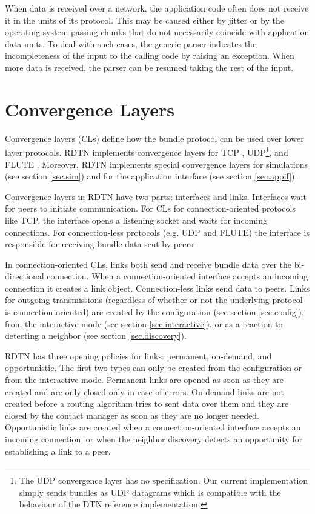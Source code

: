 \documentclass[a4paper]{article}
\begin{document}
When data is received over a network, the application code often does not
receive it in the units of its protocol. This may be caused either by jitter or
by the operating system passing chunks that do not necessarily coincide with
application data units. To deal with such cases, the generic parser indicates
the incompleteness of the input to the calling code by raising an exception.
When more data is received, the parser can be resumed taking the rest of the
input.

\section{Convergence Layers}\label{sec.cl}

Convergence layers (CLs) define how the bundle protocol can be used over lower
layer protocols. RDTN implements convergence layers for TCP \cite{dtn-tcp-cl},
UDP\footnote{The UDP convergence layer has no specification. Our current
implementation simply sends bundles as UDP datagrams which is compatible with
the behaviour of the DTN reference implementation.}, and FLUTE \cite{uni-dtn}.
Moreover, RDTN implements special convergence layers for simulations (see
section \ref{sec.sim}) and for the application interface (see section
\ref{sec.appif}).

Convergence layers in RDTN have two parts: interfaces and links. Interfaces wait
for peers to initiate communication. For CLs for connection-oriented protocols
like TCP, the interface opens a listening socket and waits for incoming
connections. For connection-less protocols (e.g. UDP and FLUTE) the interface is
responsible for receiving bundle data sent by peers.

In connection-oriented CLs, links both send and receive bundle data over the
bi-directional connection. When a connection-oriented interface accepts an
incoming connection it creates a link object. Connection-less links send data to
peers. Links for outgoing transmissions (regardless of whether or not the
underlying protocol is connection-oriented) are created by the configuration
(see section \ref{sec.config}), from the interactive mode (see section
\ref{sec.interactive}), or as a reaction to detecting a neighbor (see section
\ref{sec.discovery}).

RDTN has three opening policies for links: permanent, on-demand, and
opportunistic. The first two types can only be created from the
configuration or from the interactive mode. Permanent links are opened as soon
as they are created and are only closed only in case of errors. On-demand links
are not created before a routing algorithm tries to sent data over them and they
are closed by the contact manager as soon as they are no longer needed.
Opportunistic links are created when a connection-oriented interface accepts an
incoming connection, or when the neighbor discovery detects an opportunity for
establishing a link to a peer.
\end{document}
